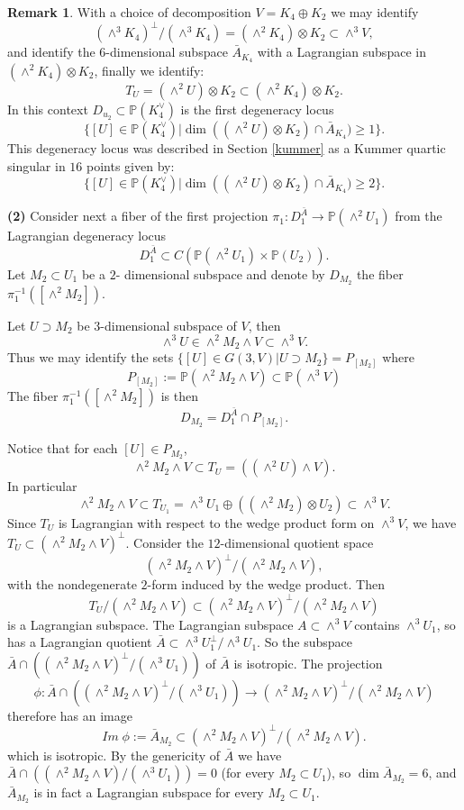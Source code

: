 \documentclass[a4paper,11pt]{amsart}
\theoremstyle{definition}
\newtheorem{rem}[thm]{Remark}
\numberwithin{equation}{section}
\numberwithin{equation}{section} \theoremstyle{definition}
\begin{document}
\begin{rem}
With a choice of decomposition $V=K_4\oplus K_2$ we may identify 
$$(\wedge^3 K_4)^{\perp}/(\wedge^3 K_4)= (\wedge^2 K_4) \otimes K_2\subset \wedge^3 V,$$
and identify the $6$-dimensional subspace  $\bar{A}_{K_4}$ with a Lagrangian subspace in $(\wedge^2 K_4) \otimes K_2$, finally we identify:
\[
T_U=(\wedge^2 U) \otimes K_2\subset (\wedge^2 K_4) \otimes K_2.
\]  
In this context $D_{u_2}\subset  {{\mathbb{P}}}(K_4^{\vee}) $ is  the first degeneracy locus 
$$\{[U]\in {{\mathbb{P}}}(K_4^{\vee}) | \dim ((\wedge^2 U) \otimes K_2)\cap \bar{A}_{K_4})\geq 1\} .$$ 
This degeneracy locus was described in Section \ref{kummer} as a Kummer quartic singular in $16$ points given by:
$$\{[U]\in {{\mathbb{P}}}(K_4^{\vee}) | \dim ((\wedge^2 U) \otimes K_2)\cap \bar{A}_{K_4})\geq 2\}.$$

\textbf{(2)} Consider next a fiber of the first projection $\pi_1: D_1^{\bar{A}} \to {{\mathbb{P}}}(\wedge^2 U_1)$  from the Lagrangian degeneracy locus
\[
D_1^{\bar{A}} \subset C(\mathbb{P}(\wedge^2 U_1)\times \mathbb{P}(U_2)).
\]
Let $M_2\subset U_1$ be a $2$- dimensional subspace and denote by  $D_{M_2}$ the fiber $\pi_1^{-1}([\wedge^2M_2])$. 

Let $U\supset M_2$ be $3$-dimensional subspace of $V$, then 
\[
\wedge^3 U\in\wedge^2M_2\wedge V\subset \wedge^3V.
\]
  Thus  we may identify the sets $\{[U]\in G(3,V)| U\supset M_2\}=P_{[M_2]}$ where 
 \[
P_{[M_2]}:={{\mathbb{P}}}(\wedge^2M_2\wedge V)\subset {{\mathbb{P}}}(\wedge^3V)
 \]
The fiber $\pi_1^{-1}([\wedge^2M_2])$ is then 
\[
D_{M_2}=D_1^{\bar{A}}\cap P_{[M_2]}.
\]

 
Notice that for each $[U]\in P_{M_2}$,
\[
\wedge^2 M_2\wedge V\subset T_U=((\wedge^2 U )\wedge V ).
\]
In particular 
\[
\wedge^2 M_2\wedge V\subset T_{U_1}=\wedge^3 U_1 \oplus ((\wedge^2 M_2)\otimes U_2)\subset \wedge^3 V.
\]
Since $T_U$ is Lagrangian with respect to the wedge product form on $\wedge^3V$, we have $T_U\subset (\wedge^2 M_2\wedge V)^{\perp}$.
Consider the $12$-dimensional quotient space 
\[
(\wedge^2 M_2\wedge V)^{\perp}/(\wedge^2 M_2\wedge V),
\]
with the nondegenerate $2$-form  induced by the wedge product.
Then 
\[
T_U/(\wedge^2 M_2\wedge V)\subset (\wedge^2 M_2\wedge V)^{\perp}/(\wedge^2 M_2\wedge V)
\] 
is a Lagrangian subspace.
The Lagrangian subspace $A\subset \wedge^3V$ contains $\wedge^3 U_1$, so has a Lagrangian quotient $\bar{A}\subset \wedge^3 U_1^{\bot}/\wedge^3 U_1$.
So the subspace $\bar{A}\cap ((\wedge^2 M_2\wedge V)^{\bot}/(\wedge^3 U_1))$  of $\bar{A}$ is isotropic. 
The projection 
\[
\phi:\bar{A}\cap ((\wedge^2 M_2\wedge V)^{\bot}/(\wedge^3 U_1))\to (\wedge^2 M_2\wedge V)^{\perp}/(\wedge^2 M_2\wedge V)
\] 
therefore has an image 
\[
Im\; \phi:=\bar{A}_{M_2}\subset(\wedge^2 M_2\wedge V)^{\perp}/(\wedge^2 M_2\wedge V).
\]
which is isotropic.
 By the genericity of $\bar{A}$ we have $\bar{A}\cap  ((\wedge^2 M_2\wedge V)/(\wedge^3 U_1))=0$ (for every $M_2\subset U_1$), so $\dim \bar{A}_{M_2}=6$, and
$\bar{A}_{M_2}$ is in fact a Lagrangian subspace for every $M_2\subset U_1$.


\end{rem}
\end{document}

